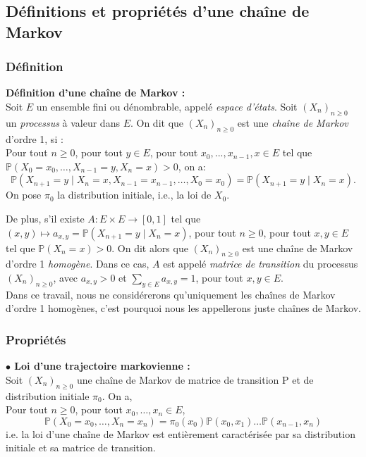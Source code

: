 \documentclass[11pt]{article}
\begin{document}
\subsection{Définitions et propriétés d'une chaîne de Markov}
\subsubsection{ Définition}

\textbf{Définition d'une chaîne de Markov :}\\
Soit $E$ un ensemble fini ou dénombrable, appelé \textit{espace d'états}. Soit $(X_n)_{n \ge 0}$ un \textit{processus} à valeur dans $E$.
On dit que $(X_n)_{n \ge 0}$ est une \textit{chaîne de Markov} d'ordre 1, si :\\
Pour tout $n \ge 0$, pour tout $y \in E$, pour tout $x_0,...,x_{n-1},x \in E$ tel que $\mathbb{P}(X_0 = x_0, \ldots, X_{n-1} = y, X_n = x) > 0$, on a:
\[
\mathbb{P}(X_{n+1} = y \mid X_n = x, X_{n-1} = x_{n-1},\ldots,X_0=x_0)=\mathbb{P}(X_{n+1}=y \mid X_n=x).
\]
On pose $\pi_0$ la distribution initiale, i.e., la loi de $X_0$.

De plus, s'il existe $A : E \times E \to [0,1]$ tel que $(x,y) \mapsto a_{x,y}=\mathbb{P}(X_{n+1} = y \mid X_n = x)$, pour tout $n \ge 0$, pour tout $x,y \in E$ tel que $\mathbb{P}(X_n=x) > 0$.
On dit alors que $(X_n)_{n \ge 0}$ est une chaîne de Markov d'ordre 1 \textit{homogène}.
Dans ce cas, $A$ est appelé \textit{matrice de transition} du processus $(X_n)_{n \ge 0}$, avec $a_{x,y}>0$ et $\sum_{y \in E}a_{x,y}=1$, pour tout $x,y \in E$.\\

Dans ce travail, nous ne considérerons qu'uniquement les chaînes de Markov d'ordre 1 homogènes, c'est pourquoi nous les appellerons juste chaînes de Markov.

\subsubsection{Propriétés}
\textbf{$\bullet$ Loi d'une trajectoire markovienne :} \\
Soit $(X_n)_{n \ge 0}$ une chaîne de Markov de matrice de transition P et de distribution initiale $\pi_0$. On a,\\
Pour tout $n \ge 0$, pour tout $x_0, \ldots, x_n \in E$, 
\[
\mathbb{P}(X_0=x_0, \ldots, X_n=x_n) = \pi_0(x_0) \mathbb{P}(x_0,x_1) \ldots \mathbb{P}(x_{n-1},x_n)
\]
i.e. la loi d'une chaîne de Markov est entièrement caractérisée par sa distribution initiale et sa matrice de transition.
\end{document}

